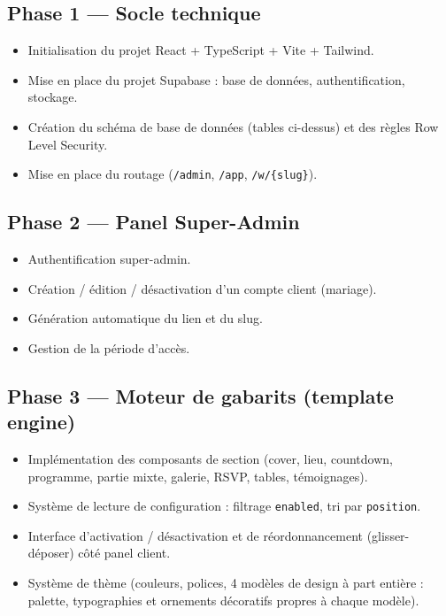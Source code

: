 \documentclass[11pt,a4paper]{article}
\begin{document}
\subsection{Phase 1 --- Socle technique}
\begin{itemize}[leftmargin=1.2cm]
  \item Initialisation du projet React + TypeScript + Vite + Tailwind.
  \item Mise en place du projet Supabase : base de données, authentification,
        stockage.
  \item Création du schéma de base de données (tables ci-dessus) et des règles
        Row Level Security.
  \item Mise en place du routage (\texttt{/admin}, \texttt{/app}, \texttt{/w/\{slug\}}).
\end{itemize}

\subsection{Phase 2 --- Panel Super-Admin}
\begin{itemize}[leftmargin=1.2cm]
  \item Authentification super-admin.
  \item Création / édition / désactivation d'un compte client (mariage).
  \item Génération automatique du lien et du slug.
  \item Gestion de la période d'accès.
\end{itemize}

\subsection{Phase 3 --- Moteur de gabarits (template engine)}
\begin{itemize}[leftmargin=1.2cm]
  \item Implémentation des composants de section (cover, lieu, countdown,
        programme, partie mixte, galerie, RSVP, tables, témoignages).
  \item Système de lecture de configuration : filtrage \texttt{enabled}, tri par
        \texttt{position}.
  \item Interface d'activation / désactivation et de réordonnancement
        (glisser-déposer) côté panel client.
  \item Système de thème (couleurs, polices, 4 modèles de design à part
        entière : palette, typographies et ornements décoratifs propres à
        chaque modèle).
\end{itemize}
\end{document}

